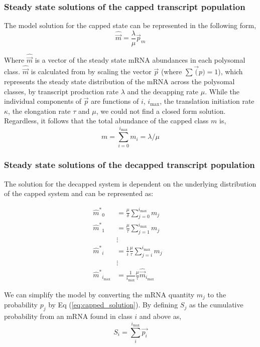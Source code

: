 \documentclass[10pt,letterpaper]{article}
\newcommand{\imax}{\ensuremath{{i_{\max}}}\xspace}
\newcommand{\mhat}{\ensuremath{\hat{m}}\xspace}
\newcommand{\mhatstar}{\ensuremath{\mhat^{*}}\xspace}
\newcommand{\mvec}{\ensuremath{\vec{m}}\xspace}
\newcommand{\mvechat}{\ensuremath{\hat{\mvec}}\xspace}
\newcommand{\msum}{\ensuremath{m}\xspace}
\begin{document}
\subsubsection*{Steady state solutions of the capped transcript population}
 The model solution for the capped state can be represented in the following form,
	\begin{equation} \label{eq:capped_solution}
		\mvechat=\frac{\lambda}{\mu}\vec{p}_m
	\end{equation}

Where \mvechat is a vector of the steady state mRNA abundances in each polysomal class.
\mvechat is calculated from by scaling  the vector $\vec{p}$ (where $\sum \vec(p) = 1$), which represents the steady state distribution of the mRNA across the polysomal classes, by transcript production rate $\lambda$ and the decapping rate $\mu$.
While the individual components of $\vec{p}$ are functions of $i$, \imax, the translation initiation rate $\kappa$, the elongation rate $\tau$ and $\mu$, we could not find a closed form solution.
Regardless, it follows that the total abundance of the capped class \msum is,
\begin{equation}\label{eq:capped_sum}
\msum = \sum_{i = 0} ^\imax m_i = \lambda/\mu
\end{equation}

\subsubsection*{Steady state solutions of the decapped transcript population}

The solution for the decapped system is dependent on the underlying distribution of the capped system and can be represented as:

\begin{align} 
\label{eq:decapped_abundance}
\mhatstar_0  &= \frac{\mu}{\delta}\sum_{j=0}^{\imax}m_{j} \nonumber \\
\mhatstar_1  &= \frac{\mu}{\tau}\sum_{j=1}^{\imax}m_{j}  \nonumber \\
& \vdots &  \\
\mhatstar_i  &= \frac{1}{i}\frac{\mu}{\tau}\sum_{j=i}^{\imax}m_{j}  \nonumber \\
& \vdots & \nonumber \\
\mhatstar_{\imax}  &= \frac{1}{\imax}\frac{\mu}{\tau} \mvechat_{\imax}   \nonumber
\end{align}

We can simplify the model by converting the mRNA quantity $m_{j}$ to the probability $p_{j}$ by Eq (\ref{eq:capped_solution}). By defining $S_{j}$ as the cumulative probability from an mRNA found in class $i$ and above as,
\begin{equation}
		S_{i} = \sum_{i}^{\imax}\vec{p_{i}}
\end{equation}
\end{document}
